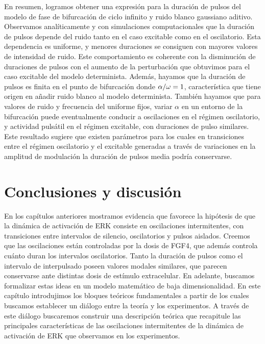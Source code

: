 \documentclass[./main.tex]{subfiles}
\begin{document}
En resumen, logramos obtener una expresión para la duración de pulsos del modelo de fase de bifurcación de ciclo infinito y ruido blanco gaussiano aditivo. Observamos analíticamente y con simulaciones computacionales que la duración de pulsos depende del ruido tanto en el caso excitable como en el oscilatorio. Esta dependencia es uniforme, y menores duraciones se consiguen con mayores valores de intensidad de ruido. Este comportamiento es coherente con la disminución de duraciones de pulsos con el aumento de la perturbación que obtuvimos para el caso excitable del modelo determinista. Además, hayamos que la duración de pulsos es finita en el punto de bifurcación donde $\alpha/\omega = 1$, característica que tiene origen en añadir ruido blanco al modelo determinista. También hayamos que para valores de ruido y frecuencia del uniforme fijos, variar $\alpha$ en un entorno de la bifurcación puede eventualmente conducir a oscilaciones en el régimen oscilatorio, y actividad pulsátil en el régimen excitable, con duraciones de pulso similares. Este resultado sugiere que existen parámetros para los cuales en transiciones entre el régimen oscilatorio y el excitable generadas a través de variaciones en la amplitud de modulación la duración de pulsos media podría conservarse. 


\section{Conclusiones y discusión}

En los capítulos anteriores mostramos evidencia que favorece la hipótesis de que la dinámica de activación de ERK consiste en oscilaciones intermitentes, con transiciones entre intervalos de silencio, oscilatorios y pulsos aislados. Creemos que las oscilaciones están controladas por la dosis de FGF4, que además controla cuánto duran los intervalos oscilatorios. Tanto la duración de pulsos como el intervalo de interpulsado poseen valores modales similares, que parecen conservarse ante distintas dosis de estímulo extracelular. En adelante, buscamos formalizar estas ideas en un modelo matemático de baja dimensionalidad. En este capítulo introdujimos los bloques teóricos fundamentales a partir de los cuales buscamos establecer un diálogo entre la teoría y los experimentos. A través de este diálogo buscaremos construir una descripción teórica que recapitule las principales características de las oscilaciones intermitentes de la dinámica de activación de ERK que observamos en los experimentos. 
\end{document}
